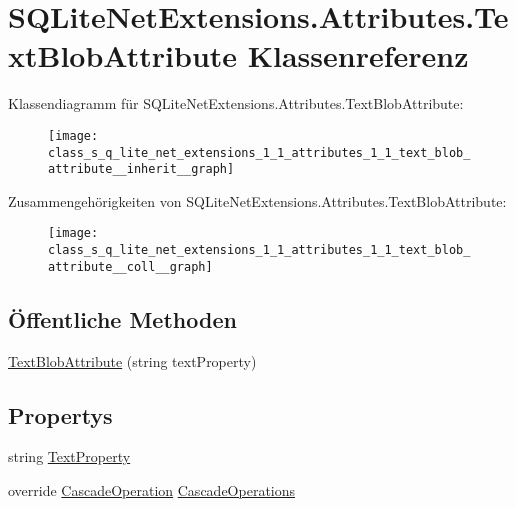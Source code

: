 \hypertarget{class_s_q_lite_net_extensions_1_1_attributes_1_1_text_blob_attribute}{}\section{S\+Q\+Lite\+Net\+Extensions.\+Attributes.\+Text\+Blob\+Attribute Klassenreferenz}
\label{class_s_q_lite_net_extensions_1_1_attributes_1_1_text_blob_attribute}


Klassendiagramm für S\+Q\+Lite\+Net\+Extensions.\+Attributes.\+Text\+Blob\+Attribute\+:\nopagebreak
\begin{figure}[H]
\begin{center}
\leavevmode
\texttt{[image: class\_s\_q\_lite\_net\_extensions\_1\_1\_attributes\_1\_1\_text\_blob\_attribute\_\_inherit\_\_graph]}
\end{center}
\end{figure}


Zusammengehörigkeiten von S\+Q\+Lite\+Net\+Extensions.\+Attributes.\+Text\+Blob\+Attribute\+:\nopagebreak
\begin{figure}[H]
\begin{center}
\leavevmode
\texttt{[image: class\_s\_q\_lite\_net\_extensions\_1\_1\_attributes\_1\_1\_text\_blob\_attribute\_\_coll\_\_graph]}
\end{center}
\end{figure}
\subsection*{Öffentliche Methoden}
\begin{DoxyCompactItemize}
\item 
\mbox{\hyperlink{class_s_q_lite_net_extensions_1_1_attributes_1_1_text_blob_attribute_ac925ad0b0db166fe0c720e794104699c}{Text\+Blob\+Attribute}} (string text\+Property)
\end{DoxyCompactItemize}
\subsection*{Propertys}
\begin{DoxyCompactItemize}
\item 
string \mbox{\hyperlink{class_s_q_lite_net_extensions_1_1_attributes_1_1_text_blob_attribute_a30bb52fdf2d622ee564d8f1bcab1f3d3}{Text\+Property}}
\item 
override \mbox{\hyperlink{namespace_s_q_lite_net_extensions_1_1_attributes_a84ac4ba359abf94192d7335a2303c619}{Cascade\+Operation}} \mbox{\hyperlink{class_s_q_lite_net_extensions_1_1_attributes_1_1_text_blob_attribute_a03bbcbdf6ce6e6900120f20022136ac7}{Cascade\+Operations}}
\end{DoxyCompactItemize}
